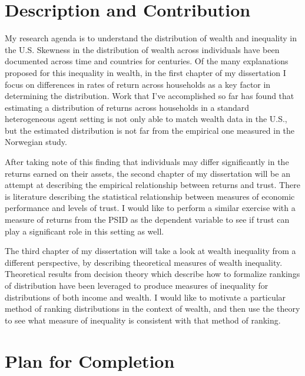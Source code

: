 \documentclass[\econtexRoot/Chp1proposal]{subfiles}
\begin{document}
\hypertarget{Introduction}{}
\section{Description and Contribution}\notinsubfile{\label{sec:intro}}
\setcounter{page}{0}

\par My research agenda is to understand the distribution of wealth and inequality in the U.S. Skewness in the distribution of wealth across individuals have been documented across time and countries for centuries. Of the many explanations proposed for this inequality in wealth, in the first chapter of my dissertation I focus on differences in rates of return across households as a key factor in determining the distribution. Work that I've accomplished so far has found that estimating a distribution of returns across households in a standard heterogeneous agent setting is not only able to match wealth data in the U.S., but the estimated distribution is not far from the empirical one measured in the Norwegian study.

\par After taking note of this finding that individuals may differ significantly in the returns earned on their assets, the second chapter of my dissertation will be an attempt at describing the empirical relationship between returns and trust. There is literature describing the statistical relationship between measures of economic performance and levels of trust. I would like to perform a similar exercise with a measure of returns from the PSID as the dependent variable to see if trust can play a significant role in this setting as well.

\par The third chapter of my dissertation will take a look at wealth inequality from a different perspective, by describing theoretical measures of wealth inequality. Theoretical results from decision theory which describe how to formalize rankings of distribution have been leveraged to produce measures of inequality for distributions of both income and wealth. I would like to motivate a particular method of ranking distributions in the context of wealth, and then use the theory to see what measure of inequality is consistent with that method of ranking. 


\section{Plan for Completion}
\end{document}
